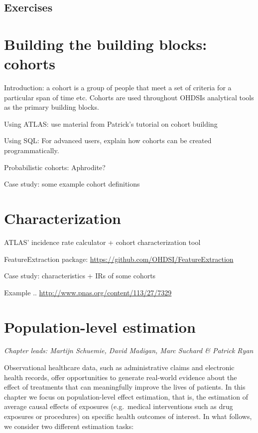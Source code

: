 \documentclass[11pt]{book}
\begin{document}
\section{Exercises}\label{exercises-1}

\chapter{Building the building blocks: cohorts}\label{Cohorts}

Introduction: a cohort is a group of people that meet a set of criteria
for a particular span of time etc. Cohorts are used throughout OHDSIs
analytical tools as the primary building blocks.

Using ATLAS: use material from Patrick's tutorial on cohort building

Using SQL: For advanced users, explain how cohorts can be created
programmatically.

Probabilistic cohorts: Aphrodite?

Case study: some example cohort definitions

\chapter{Characterization}\label{Characterization}

ATLAS' incidence rate calculator + cohort characterization tool

FeatureExtraction package:
\url{https://github.com/OHDSI/FeatureExtraction}

Case study: characteristics + IRs of some cohorts

Example .. \url{http://www.pnas.org/content/113/27/7329}

\chapter{Population-level estimation}\label{PopulationLevelEstimation}

\emph{Chapter leads: Martijn Schuemie, David Madigan, Marc Suchard \&
Patrick Ryan}

Observational healthcare data, such as administrative claims and
electronic health records, offer opportunities to generate real-world
evidence about the effect of treatments that can meaningfully improve
the lives of patients. In this chapter we focus on population-level
effect estimation, that is, the estimation of average causal effects of
exposures (e.g.~medical interventions such as drug exposures or
procedures) on specific health outcomes of interest. In what follows, we
consider two different estimation tasks:
\end{document}
